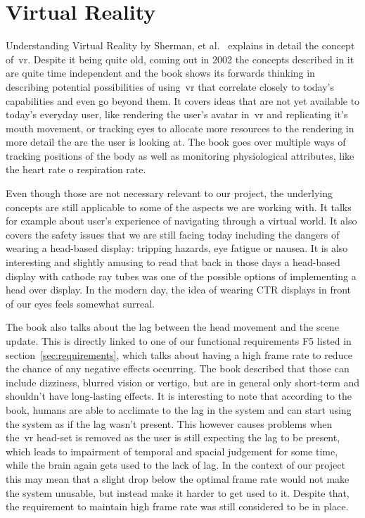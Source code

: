 \section{Virtual Reality}

    Understanding Virtual Reality by Sherman, et al.~\cite{sherman2003} explains in detail the concept of~\acrfull{vr}. Despite it being quite old, coming out in 2002 the concepts described in it are quite time independent and the book shows its forwards thinking in describing potential possibilities of using~\acrshort{vr} that correlate closely to today's capabilities and even go beyond them. It covers ideas that are not yet available to today's everyday user, like rendering the user's avatar in~\acrshort{vr} and replicating it's mouth movement, or tracking eyes to allocate more resources to the rendering in more detail the are the user is looking at. The book goes over multiple ways of tracking positions of the body as well as monitoring physiological attributes, like the heart rate o respiration rate.
    
    Even though those are not necessary relevant to our project, the underlying concepts are still applicable to some of the aspects we are working with. It talks for example about user's experience of navigating through a virtual world. It also covers the safety issues that we are still facing today including the dangers of wearing a head-based display: tripping hazards, eye fatigue or nausea. It is also interesting and slightly amusing to read that back in those days a head-based display with cathode ray tubes was one of the possible options of implementing a head over display. In the modern day, the idea of wearing CTR displays in front of our eyes feels somewhat surreal.
    
    The book also talks about the lag between the head movement and the scene update. This is directly linked to one of our functional requirements F5 listed in section~\ref{sec:requirements}, which talks about having a high frame rate to reduce the chance of any negative effects occurring. The book described that those can include dizziness, blurred vision or vertigo, but are in general only short-term and shouldn't have long-lasting effects. It is interesting to note that according to the book, humans are able to acclimate to the lag in the system and can start using the system as if the lag wasn't present. This however causes problems when the~\acrshort{vr} head-set is removed as the user is still expecting the lag to be present, which leads to impairment of temporal and spacial judgement for some time, while the brain again gets used to the lack of lag. In the context of our project this may mean that a slight drop below the optimal frame rate would not make the system unusable, but instead make it harder to get used to it. Despite that, the requirement to maintain high frame rate was still considered to be in place.
    
